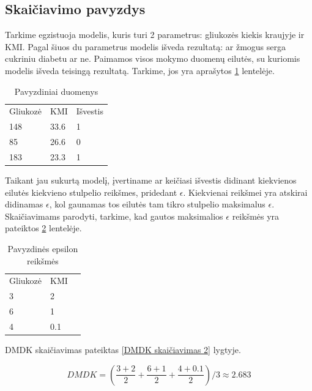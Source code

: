 \documentclass{VUMIFInfBakalaurinis}
\begin{document}
\subsection{Skaičiavimo pavyzdys}
\par Tarkime egzistuoja modelis, kuris turi 2 parametrus: gliukozės kiekis kraujyje ir KMI. Pagal šiuos du parametrus modelis išveda rezultatą: ar žmogus serga cukriniu diabetu ar ne. Paimamos visos mokymo duomenų eilutės, su kuriomis modelis išveda teisingą rezultatą. Tarkime, jos yra aprašytos \ref{tab:Pavyzdiniai duomenys 1} lentelėje.

\begin{table}[h]
\centering
\begin{tabular}{|l|l|l|}
\cline{1-3}
Gliukozė & KMI  & Išvestis \\\cline{1-3}
148      & 33.6 & 1        \\\cline{1-3}
85       & 26.6 & 0        \\\cline{1-3}
183      & 23.3 & 1        \\\cline{1-3}
\end{tabular}
\caption{Pavyzdiniai duomenys}
\label{tab:Pavyzdiniai duomenys 1}
\end{table}

\par Taikant jau sukurtą modelį, įvertiname ar keičiasi išvestis didinant kiekvienos eilutės kiekvieno stulpelio reikšmes, pridedant $\epsilon$. Kiekvienai reikšmei yra atskirai didinamas $\epsilon$, kol gaunamas tos eilutės tam tikro stulpelio maksimalus $\epsilon$. Skaičiavimams parodyti, tarkime, kad gautos maksimalios $\epsilon$ reikšmės yra pateiktos \ref{tab:my-table2} lentelėje.

\begin{table}[t]
\centering
\begin{tabular}{|l|l|l|}
\cline{1-2}
Gliukozė & KMI \\\cline{1-2}
3      & 2 \\\cline{1-2}
6       & 1 \\\cline{1-2}
4      & 0.1 \\\cline{1-2}
\end{tabular}
\caption{Pavyzdinės epsilon reikšmės}
\label{tab:my-table2}
\end{table}

\par DMDK skaičiavimas pateiktas \eqref{DMDK skaičiavimas 2} lygtyje.

\begin{equation}
DMDK = (\frac{3 + 2}{2} + \frac{6 + 1}{2} + \frac{4 + 0.1}{2})/3 \approx 2.683
\label{DMDK skaičiavimas 2}
\end{equation}
\end{document}
